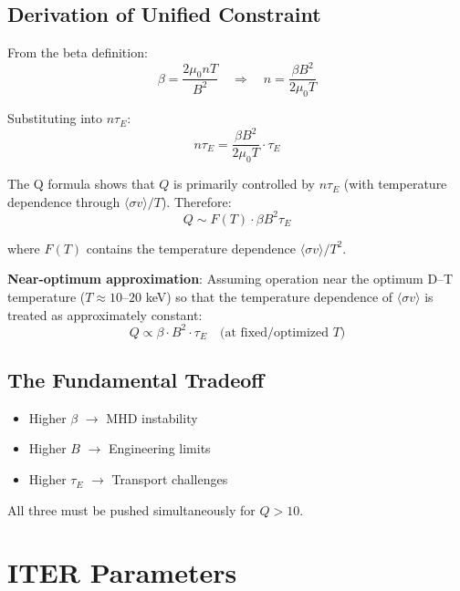 \documentclass[11pt,a4paper]{article}
\begin{document}
\subsection{Derivation of Unified Constraint}

From the beta definition:
\begin{equation}
\beta = \frac{2\mu_0 nT}{B^2} \quad \Rightarrow \quad n = \frac{\beta B^2}{2\mu_0 T}
\end{equation}

Substituting into $n\tau_E$:
\begin{equation}
n\tau_E = \frac{\beta B^2}{2\mu_0 T} \cdot \tau_E
\end{equation}

The Q formula shows that $Q$ is primarily controlled by $n\tau_E$ (with 
temperature dependence through $\langle\sigma v\rangle/T$). Therefore:
\begin{equation}
Q \sim F(T) \cdot \beta B^2 \tau_E
\end{equation}

where $F(T)$ contains the temperature dependence $\langle\sigma v\rangle/T^2$.

\textbf{Near-optimum approximation}: Assuming operation near the optimum D--T 
temperature ($T \approx 10$--$20$ keV) so that the temperature dependence of 
$\langle\sigma v\rangle$ is treated as approximately constant:
\begin{equation}
\boxed{Q \propto \beta \cdot B^2 \cdot \tau_E} \quad \text{(at fixed/optimized $T$)}
\end{equation}

\subsection{The Fundamental Tradeoff}

\begin{itemize}
\item Higher $\beta$ $\rightarrow$ MHD instability
\item Higher $B$ $\rightarrow$ Engineering limits
\item Higher $\tau_E$ $\rightarrow$ Transport challenges
\end{itemize}

All three must be pushed simultaneously for $Q > 10$.

\section{ITER Parameters}
\end{document}
